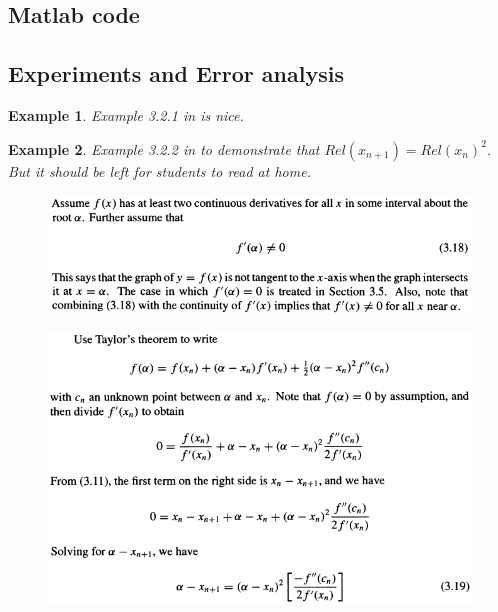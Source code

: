 \documentclass[12pt]{article}
\theoremstyle{theorem}
\newtheorem{exa}{Example}
\begin{document}
\subsection{Matlab code}

\begin{shaded}
	
\end{shaded}

\subsection{Experiments and Error analysis}

\begin{exa}
Example 3.2.1 in \cite{AtkH03} is nice.
\end{exa}

\begin{exa}
Example 3.2.2 in \cite{AtkH03} to demonstrate that $Rel(x_{n+1}) = Rel(x_n)^2$. But it should be left for students to read at home.
\end{exa}

\begin{figure}[h!]
	\centering
	\includegraphics[scale=0.8]{Figures/4}
\end{figure}

\begin{figure}[h!]
	\centering
	\includegraphics[scale=0.8]{Figures/5}
\end{figure}
\end{document}
